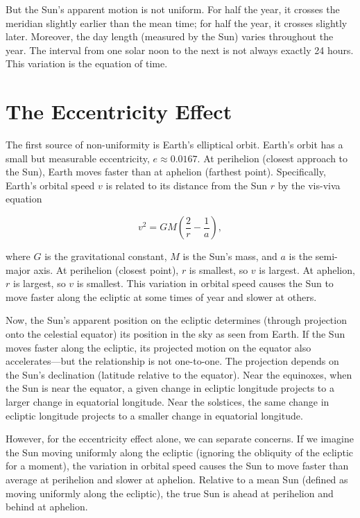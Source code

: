 But the Sun's apparent motion is not uniform. For half the year, it crosses the meridian slightly earlier than the mean time; for half the year, it crosses slightly later. Moreover, the day length (measured by the Sun) varies throughout the year. The interval from one solar noon to the next is not always exactly 24 hours. This variation is the equation of time.

\section{The Eccentricity Effect}

The first source of non-uniformity is Earth's elliptical orbit. Earth's orbit has a small but measurable eccentricity, $e \approx 0.0167$. At perihelion (closest approach to the Sun), Earth moves faster than at aphelion (farthest point). Specifically, Earth's orbital speed $v$ is related to its distance from the Sun $r$ by the vis-viva equation

\[
  v^2 = GM \left( \frac{2}{r} - \frac{1}{a} \right),
\]

where $G$ is the gravitational constant, $M$ is the Sun's mass, and $a$ is the semi-major axis. At perihelion (closest point), $r$ is smallest, so $v$ is largest. At aphelion, $r$ is largest, so $v$ is smallest. This variation in orbital speed causes the Sun to move faster along the ecliptic at some times of year and slower at others.

Now, the Sun's apparent position on the ecliptic determines (through projection onto the celestial equator) its position in the sky as seen from Earth. If the Sun moves faster along the ecliptic, its projected motion on the equator also accelerates—but the relationship is not one-to-one. The projection depends on the Sun's declination (latitude relative to the equator). Near the equinoxes, when the Sun is near the equator, a given change in ecliptic longitude projects to a larger change in equatorial longitude. Near the solstices, the same change in ecliptic longitude projects to a smaller change in equatorial longitude.

However, for the eccentricity effect alone, we can separate concerns. If we imagine the Sun moving uniformly along the ecliptic (ignoring the obliquity of the ecliptic for a moment), the variation in orbital speed causes the Sun to move faster than average at perihelion and slower at aphelion. Relative to a mean Sun (defined as moving uniformly along the ecliptic), the true Sun is ahead at perihelion and behind at aphelion.

